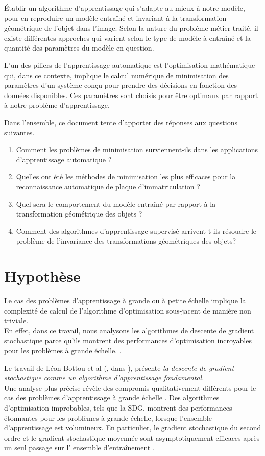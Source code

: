 		Établir un algorithme d’apprentissage qui s'adapte au mieux à notre modèle, pour en reproduire un modèle entraîné et invariant à la transformation géométrique de l’objet dans l'image. Selon la nature du problème métier traité, il existe différentes approches qui varient selon le type de modèle à entraîné et la quantité des paramètres du modèle en question.
		
		L'un des piliers de l'apprentissage automatique est l'optimisation mathématique \cite{bottou2018optimization} qui, dans ce contexte, implique le calcul numérique de minimisation des paramètres d'un système conçu pour prendre des décisions en fonction des données disponibles. Ces paramètres sont choisis pour être optimaux par rapport à notre problème d'apprentissage.
		
		Dans l'ensemble, ce document tente d'apporter des réponses aux questions suivantes.
		\begin{enumerate}
			\item Comment les problèmes de minimisation surviennent-ils dans les applications d'apprentissage automatique ?
			\item Quelles ont été les méthodes de minimisation les plus efficaces pour la reconnaissance automatique de plaque d’immatriculation ?
			\item Quel sera le comportement du  modèle entraîné par rapport à la transformation géométrique des objets ?
			
			\item Comment des algorithmes d'apprentissage supervisé arrivent-t-ils résoudre le problème de l’invariance des transformations géométriques des objets?
		\end{enumerate}
	
	\section{Hypothèse}
		Le cas des problèmes d'apprentissage à grande ou à petite échelle implique la complexité de calcul de l'algorithme d'optimisation sous-jacent de manière non triviale.\\
		En effet, dans ce travail, nous analysons les algorithmes de descente de gradient stochastique parce qu’ils montrent des performances  d'optimisation incroyables pour les problèmes à grande échelle. \cite{bottou2010large}.
		
		Le travail de Léon Bottou et al (\eg, dans \cite{bottou2010large} \cite{wijnhoven2010fast} \cite{bottou2012stochastic} ), présente \textit{la descente de gradient stochastique comme un algorithme d'apprentissage fondamental}.\\
		Une analyse plus précise révèle des compromis qualitativement différents pour le cas des problèmes d'apprentissage à grande échelle \cite{bottou2018optimization}. Des algorithmes d'optimisation improbables, tels que la SDG, montrent des performances étonnantes pour les problèmes à grande échelle, lorsque l'ensemble d'apprentissage est volumineux. En particulier, le gradient stochastique du second ordre et le gradient stochastique moyennée sont asymptotiquement efficaces après un seul passage sur l' ensemble d'entraînement \cite{bottou2010large}. 
		
